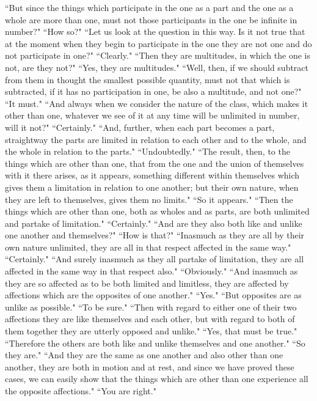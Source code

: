 \documentclass[letterpaper,12pt]{article}
\newcommand{\stephpag}[1]{\marginnote{\small\itshape\fontfamily{ppl}\selectfont #1}}
\begin{document}
``But since the things which participate in the one as a part and the one as a whole are more than one, must not those participants in the one be infinite in number?" ``How so?" ``Let us look at the question in this way. Is it not true that at the moment when they begin to participate in the one they are not one and do not participate in one?" \stephpag{c} ``Clearly." ``Then they are multitudes, in which the one is not, are they not?" ``Yes, they are multitudes." ``Well, then, if we should subtract from them in thought the smallest possible quantity, must not that which is subtracted, if it has no participation in one, be also a multitude, and not one?" ``It must." ``And always when we consider the nature of the class, which makes it other than one, whatever we see of it at any time will be unlimited in number, will it not?" ``Certainly." ``And, further, when each part becomes a part, \stephpag{d} straightway the parts are limited in relation to each other and to the whole, and the whole in relation to the parts." ``Undoubtedly." ``The result, then, to the things which are other than one, that from the one and the union of themselves with it there arises, as it appears, something different within themselves which gives them a limitation in relation to one another; but their own nature, when they are left to themselves, gives them no limits." ``So it appears." ``Then the things which are other than one, both as wholes and as parts, are both unlimited and partake of limitation." ``Certainly." \stephpag{e} ``And are they also both like and unlike one another and themselves?" ``How is that?" ``Inasmuch as they are all by their own nature unlimited, they are all in that respect affected in the same way." ``Certainly." ``And surely inasmuch as they all partake of limitation, they are all affected in the same way in that respect also." ``Obviously." ``And inasmuch as they are so affected as to be both limited and limitless, they are affected by affections which are the opposites of one another." \stephpag{159 a} ``Yes." ``But opposites are as unlike as possible." ``To be sure." ``Then with regard to either one of their two affections they are like themselves and each other, but with regard to both of them together they are utterly opposed and unlike." ``Yes, that must be true." ``Therefore the others are both like and unlike themselves and one another." ``So they are." ``And they are the same as one another and also other than one another, they are both in motion and at rest, and since we have proved these cases, we can easily show that the things \stephpag{b} which are other than one experience all the opposite affections." ``You are right."
\end{document}
